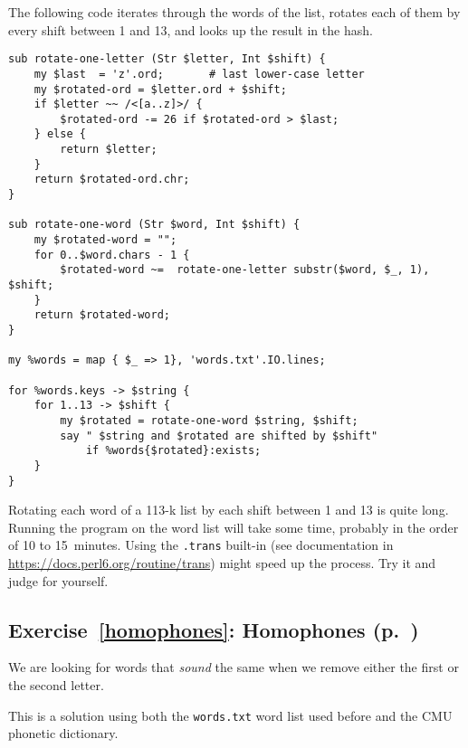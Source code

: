 The following code iterates through the words of the list, 
rotates each of them by every shift between 1 and 13, and 
looks up the result in the hash.

\begin{verbatim}
sub rotate-one-letter (Str $letter, Int $shift) {
    my $last  = 'z'.ord;       # last lower-case letter
    my $rotated-ord = $letter.ord + $shift;
    if $letter ~~ /<[a..z]>/ { 
        $rotated-ord -= 26 if $rotated-ord > $last;
    } else {
        return $letter;
    }
    return $rotated-ord.chr;
}

sub rotate-one-word (Str $word, Int $shift) {
    my $rotated-word = "";
    for 0..$word.chars - 1 {
        $rotated-word ~=  rotate-one-letter substr($word, $_, 1), $shift;
    }
    return $rotated-word;
}

my %words = map { $_ => 1}, 'words.txt'.IO.lines;

for %words.keys -> $string {
    for 1..13 -> $shift {
        my $rotated = rotate-one-word $string, $shift;
        say " $string and $rotated are shifted by $shift"
            if %words{$rotated}:exists;
    }
}
\end{verbatim}

Rotating each word of a 113-k list by each shift between 
1 and 13 is quite long. Running the program on the word list 
will take some time, probably in the order of 10 to 15~minutes.
Using the \verb'.trans' built-in (see documentation in 
\url{https://docs.perl6.org/routine/trans}) might speed up 
the process. Try it and judge for yourself.

\subsection{Exercise~\ref{homophones}: Homophones (p.~\pageref{homophones})}
\label{sol_homophones}

We are looking for words that \emph{sound} the same 
when we remove either the first or the second letter.

This is a solution using both the {\tt words.txt} word list 
used before and the CMU phonetic dictionary.

